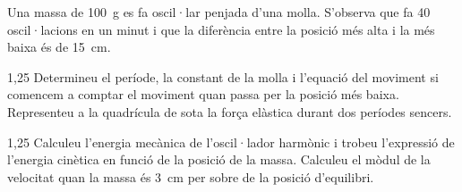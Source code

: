 Una massa de 100~g es fa oscil·lar penjada d'una molla. S'observa que fa 40 oscil·lacions en un minut i que la diferència entre la posició més alta i la més baixa és de 15~cm.

\begin{apartat}{1,25}
Determineu el període, la constant de la molla i l'equació del moviment si comencem a comptar el moviment quan passa per la posició més baixa. Representeu a la quadrícula de sota la força elàstica durant dos períodes sencers.
\end{apartat}


\begin{apartat}{1,25}
Calculeu l'energia mecànica de l'oscil·lador harmònic i trobeu l'expressió de l'energia cinètica en funció de la posició de la massa. Calculeu el mòdul de la velocitat quan la massa és 3~cm per sobre de la posició d'equilibri.
\end{apartat}
